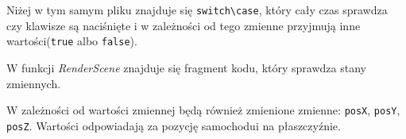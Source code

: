 \documentclass[a4paper, 12pt]{report}
\begin{document}


Niżej w tym samym pliku znajduje się \verb|switch\case|, który cały czas sprawdza czy klawisze są naciśnięte i w zależności od tego zmienne przyjmują inne wartości(\verb|true| albo \verb|false|).



W funkcji \emph{RenderScene} znajduje się fragment kodu, który sprawdza stany zmiennych.



W zależności od wartości zmiennej będą również zmienione zmienne: \verb|posX|, \verb|posY|, \verb|posZ|. Wartości odpowiadają za pozycję samochodui na płaszczyźnie. 
\end{document}
